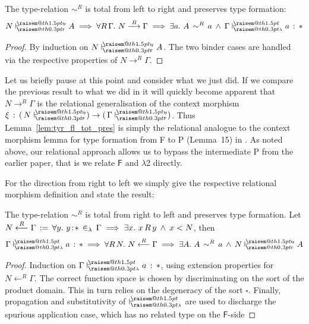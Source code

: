 \documentclass[a4paper,UKenglish]{lipics-v2016}
\makeatletter
\newcommand{\ms}{\,}
\newcommand{\mrel}[1]{\mathrel{\ms #1 \ms}}
\newcommand{\OF}{\mrel{:}}
\newcommand{\mAnd}{\mrel{\wedge}}
\newcommand{\mAll}[1]{\ensuremath{\forall} #1.\ms\ms}
\newcommand{\mEx}[1]{\ensuremath{\exists} #1.\ms\ms}
\newcommand{\eqdef}{\mrel{:=}}
\newcommand{\SysF}{\ensuremath{\mathsf{F}}\xspace}
\newcommand{\SysL}{$\lambda$2\xspace}
\newcommand{\ty}{\mathsf{ty}}
\newcommand{\of}{\ensuremath{\!:\!}}
\newcommand{\raisemath}[1]{\mathpalette{\raisem@th{#1}}}
\newcommand{\raisem@th}[3]{\raisebox{#1}{\ensuremath{#2#3}}}
\newcommand{\tsAnnot}[2]{\vdash\hspace{-.7em}^{\raisemath{1.5pt}{\scriptscriptstyle{#2}}}_{\raisemath{0.3pt}{\scriptscriptstyle{#1}}}} %
\newcommand{\cts}[2]{\ensuremath{(\,#1 #2 {})}} %
\newcommand{\tfF}{\tsAnnot{\SysF}{\ty}}  %
\newcommand{\istyF}[2]{\ensuremath{{#1} \mathrel{\tfF} #2}}
\newcommand{\tyL}{\tsAnnot{\lambda}{}} %
\newcommand{\typingL}[3]{\ensuremath{{#1} \mathrel{\tyL} #2 \OF #3}}
\newcommand{\inL}{\mrel{\in_{\lambda}}}
\newcommand{\tfP}{\tsAnnot{\mathsf{P}}{\ty}}  %
\newcommand{\tyr}{\mathrel{\sim}}
\newcommand{\tyctxrelFL}[3]{\ensuremath{#1\mathrel{\mathop{\longrightarrow}^{#2}\limits}#3}}
\newcommand{\tyctxrelLF}[3]{\ensuremath{#1\mathrel{\mathop{\longleftarrow}^{#2}\limits}#3}}
\newcommand{\Prp}{\ensuremath{\textrm{\textasteriskcentered}}}
\newcommand{\Typ}{\ensuremath{\square}}
\makeatother
\begin{document}
\begin{lemma}
  \label{lem:tyr_fl_tot_pres}
  The type-relation $\tyr^R$ is total from left to right and preserves type formation:
  \begin{align*}
    \istyF{N}{A} \implies \mAll {R\,\Gamma} \tyctxrelFL{N}{R}{\Gamma} \implies \mEx a A\,\tyr^R\,a \mAnd \typingL{\Gamma}{a}{\Prp}
  \end{align*}
\end{lemma}
\begin{proof}
  By induction on $\istyF{N}{A}$. The two binder cases are handled via the respective properties of $\tyctxrelFL{N}{R}{\Gamma}$.
\end{proof}
Let us briefly pause at this point and consider what we just did.
If we compare the previous result to what we did in \cite{KaiserEtAl:2017:sysf_pts_equiv_coq} it will quickly become apparent that $\tyctxrelFL{N}{R}{\Gamma}$ is the relational generalisation of the context morphism $\xi\ms:\ms\cts{N}{\tfF}\to\cts{\Gamma}{\tfP}$.
Thus Lemma~\ref{lem:tyr_fl_tot_pres} is simply the relational analogue to the context morphism lemma for type formation from F to P (Lemma~15) in \cite{KaiserEtAl:2017:sysf_pts_equiv_coq}.
As noted above, our relational approach allows us to bypass the intermediate P from the earlier paper, that is we relate \SysF and \SysL directly.

For the direction from right to left we simply give the respective relational morphism definition and state the result:
\begin{lemma}
  \label{lem:tyr_lf_tot_pres}
  The type-relation $\tyr^R$ is total from right to left and preserves type formation.
  Let $\tyctxrelLF{N}{R}{\Gamma} \eqdef \mAll {y} y\of\Prp \inL \Gamma \implies \mEx x x\,R\,y \mAnd x < N$, then
  \begin{align*}
    \typingL{\Gamma}{a}{\Prp} \implies \mAll {R\,N} \tyctxrelLF{N}{R}{\Gamma} \implies \mEx A A\,\tyr^R\,a \mAnd \istyF{N}{A}
  \end{align*}
\end{lemma}
\begin{proof}
  Induction on $\typingL{\Gamma}{a}{\Prp}$, using extension properties for $\tyctxrelLF{N}{R}{\Gamma}$.
  The correct function space is chosen by discriminating on the sort of the product domain.
  This in turn relies on the degeneracy of the sort $\Typ$.
  Finally, propagation and substitutivity of $\tyL$ are used to discharge the spurious application case, which has no related type on the \SysF{}-side
\end{proof}
\end{document}
